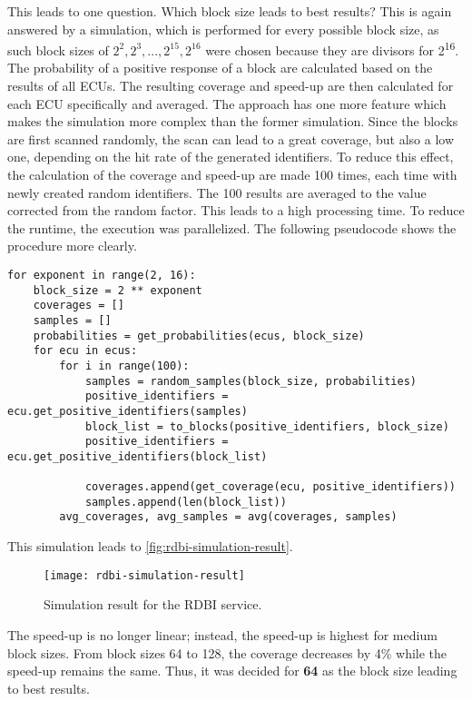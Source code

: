 This leads to one question. Which block size leads to best results? This is again answered by a simulation, which is performed for every possible block size, as such block sizes of $2^2, 2^3, ..., 2^{15}, 2^{16}$ were chosen because they are divisors for 2\textsuperscript{16}. The probability of a positive response of a block are calculated based on the results of all ECUs. The resulting coverage and speed-up are then calculated for each ECU specifically and averaged. The approach has one more feature which makes the simulation more complex than the former simulation. Since the blocks are first scanned randomly, the scan can lead to a great coverage, but also a low one, depending on the hit rate of the generated identifiers. To reduce this effect, the calculation of the coverage and speed-up are made 100 times, each time with newly created random identifiers. The 100 results are averaged to the value corrected from the random factor. This leads to a high processing time. To reduce the runtime, the execution was parallelized.
The following pseudocode shows the procedure more clearly.

\begin{samepage}
\begin{verbatim}
for exponent in range(2, 16):
    block_size = 2 ** exponent
    coverages = []
    samples = []
    probabilities = get_probabilities(ecus, block_size)
    for ecu in ecus:
        for i in range(100):
            samples = random_samples(block_size, probabilities)
            positive_identifiers = ecu.get_positive_identifiers(samples)
            block_list = to_blocks(positive_identifiers, block_size)
            positive_identifiers = ecu.get_positive_identifiers(block_list)

            coverages.append(get_coverage(ecu, positive_identifiers))
            samples.append(len(block_list))
        avg_coverages, avg_samples = avg(coverages, samples)
\end{verbatim}
\end{samepage}

This simulation leads to \autoref{fig:rdbi-simulation-result}.

\begin{figure}[h]
    \centering
    \texttt{[image: rdbi-simulation-result]}
    \caption{Simulation result for the RDBI service.}
    \label{fig:rdbi-simulation-result}
\end{figure}

The speed-up is no longer linear; instead, the speed-up is highest for medium block sizes. From block sizes 64 to 128, the coverage decreases by 4\% while the speed-up remains the same. Thus, it was decided for \textbf{64} as the block size leading to best results.

